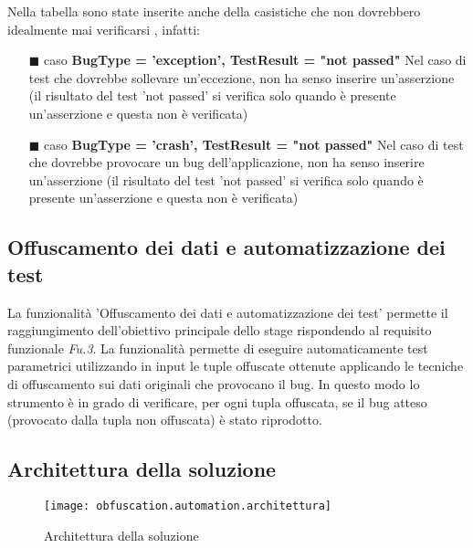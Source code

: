 \noindent Nella tabella sono state inserite anche della casistiche che non dovrebbero idealmente mai verificarsi , infatti:
\begin{itemize}[nosep]
\item [$\blacksquare$]caso \textbf{BugType = 'exception', TestResult = "not passed"} \newline
Nel caso di test che dovrebbe sollevare un'eccezione, non ha senso inserire un'asserzione (il risultato del test  'not passed' si verifica solo quando è presente un'asserzione e questa non è verificata)
\item [$\blacksquare$]caso \textbf{BugType = 'crash', TestResult = "not passed"} \newline
Nel caso di test che dovrebbe provocare un bug dell'applicazione, non ha senso inserire un'asserzione (il risultato del test  'not passed' si verifica solo quando è presente un'asserzione e questa non è verificata)
\end{itemize}


\newpage %
\subsection{Offuscamento dei dati e automatizzazione dei test}
La funzionalità 'Offuscamento dei dati e automatizzazione dei test' permette il raggiungimento dell'obiettivo principale dello stage rispondendo al requisito funzionale \emph{Fu.3}. La funzionalità permette di eseguire automaticamente test parametrici utilizzando in input le tuple offuscate ottenute applicando le tecniche di offuscamento sui dati originali che provocano il bug. In questo modo lo strumento è in grado di verificare, per ogni tupla offuscata, se il bug atteso (provocato dalla tupla non offuscata) è stato riprodotto. 

\subsection*{Architettura della soluzione}
\begin{figure}[H]
	\texttt{[image: obfuscation.automation.architettura]}
	\centering
	\caption{Architettura della soluzione}%
    \label{fig:obfautarch}
\end{figure}

